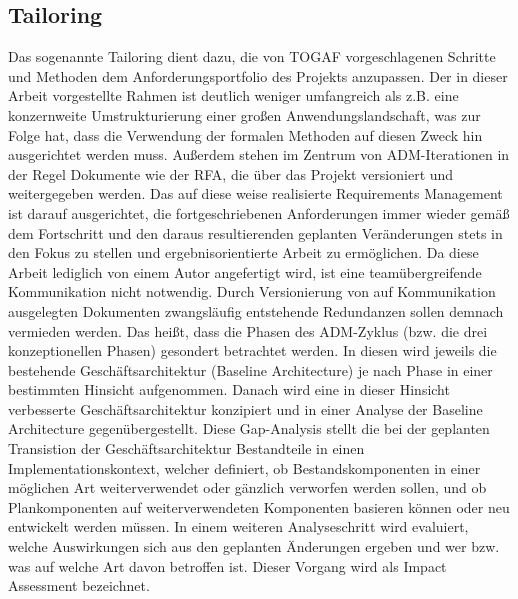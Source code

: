 \subsection{Tailoring}
Das sogenannte Tailoring dient dazu, die von TOGAF vorgeschlagenen Schritte und Methoden dem Anforderungsportfolio des Projekts anzupassen.
Der in dieser Arbeit vorgestellte Rahmen ist deutlich weniger umfangreich als z.B. eine konzernweite Umstrukturierung einer großen Anwendungslandschaft, was zur Folge hat, dass die Verwendung der formalen Methoden auf diesen Zweck hin ausgerichtet werden muss.
Außerdem stehen im Zentrum von ADM-Iterationen in der Regel Dokumente wie der RFA, die über das Projekt versioniert und weitergegeben werden.
Das auf diese weise realisierte Requirements Management ist darauf ausgerichtet, die fortgeschriebenen Anforderungen immer wieder gemäß dem Fortschritt und den daraus resultierenden geplanten Veränderungen stets in den Fokus zu stellen und ergebnisorientierte Arbeit zu ermöglichen.
Da diese Arbeit lediglich von einem Autor angefertigt wird, ist eine teamübergreifende Kommunikation nicht notwendig.
Durch Versionierung von auf Kommunikation ausgelegten Dokumenten  zwangsläufig entstehende Redundanzen sollen demnach vermieden werden.
Das heißt, dass die Phasen des ADM-Zyklus (bzw. die drei konzeptionellen Phasen) gesondert betrachtet werden.
In diesen wird jeweils die bestehende Geschäftsarchitektur (Baseline Architecture) je nach Phase in einer bestimmten Hinsicht aufgenommen.
Danach wird eine in dieser Hinsicht verbesserte Geschäftsarchitektur konzipiert und in einer Analyse der Baseline Architecture gegenübergestellt. 
Diese Gap-Analysis stellt die bei der geplanten Transistion der Geschäftsarchitektur Bestandteile in einen Implementationskontext, welcher definiert, ob Bestandskomponenten in einer möglichen Art weiterverwendet oder gänzlich verworfen werden sollen, und ob Plankomponenten auf weiterverwendeten Komponenten basieren können oder neu entwickelt werden müssen.
In einem weiteren Analyseschritt wird evaluiert, welche Auswirkungen sich aus den geplanten Änderungen ergeben und wer bzw. was auf welche Art davon betroffen ist. 
Dieser Vorgang wird als Impact Assessment bezeichnet.


